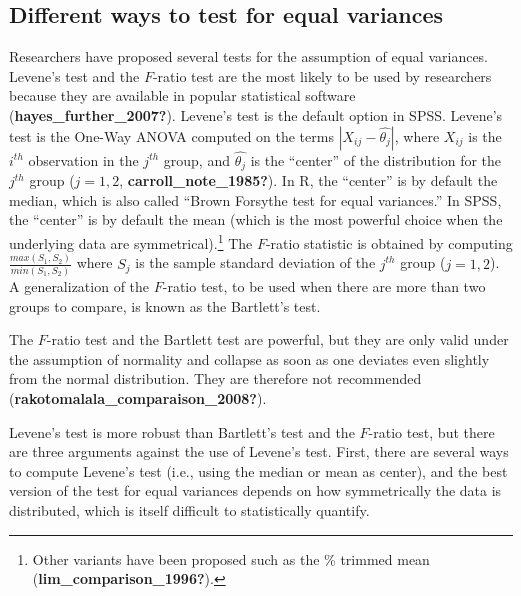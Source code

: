 \documentclass[
  english,
  man]{apa6}
\begin{document}
\hypertarget{different-ways-to-test-for-equal-variances}{%
\subsection{Different ways to test for equal variances}\label{different-ways-to-test-for-equal-variances}}

Researchers have proposed several tests for the assumption of equal variances. Levene's test and the \(F\)-ratio test are the most likely to be used by researchers because they are available in popular statistical software (\textbf{hayes\_further\_2007?}). Levene's test is the default option in SPSS. Levene's test is the One-Way ANOVA computed on the terms \(|X_{ij}-\hat{\theta_j}|\), where \(X_{ij}\) is the \(i^{th}\) observation in the \(j^{th}\) group, and \(\hat{\theta_j}\) is the ``center'' of the distribution for the \(j^{th}\) group (\(j=1,2\), \textbf{carroll\_note\_1985?}). In R, the ``center'' is by default the median, which is also called ``Brown Forsythe test for equal variances.'' In SPSS, the ``center'' is by default the mean (which is the most powerful choice when the underlying data are symmetrical).\footnote{ Other variants have been proposed such as the \% trimmed mean (\textbf{lim\_comparison\_1996?}).} The \(F\)-ratio statistic is obtained by computing \(\frac{max(S_1,S_2)}{min(S_1,S_2)}\) where \(S_j\) is the sample standard deviation of the \(j^{th}\) group (\(j=1,2\)). A generalization of the \(F\)-ratio test, to be used when there are more than two groups to compare, is known as the Bartlett's test.

The \(F\)-ratio test and the Bartlett test are powerful, but they are only valid under the assumption of normality and collapse as soon as one deviates even slightly from the normal distribution. They are therefore not recommended (\textbf{rakotomalala\_comparaison\_2008?}).

Levene's test is more robust than Bartlett's test and the \(F\)-ratio test, but there are three arguments against the use of Levene's test. First, there are several ways to compute Levene's test (i.e., using the median or mean as center), and the best version of the test for equal variances depends on how symmetrically the data is distributed, which is itself difficult to statistically quantify.
\end{document}
